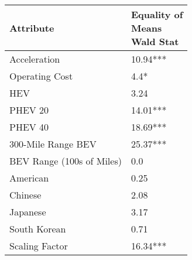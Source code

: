 \begin{tabular}{ll}
\toprule
                Attribute & \makecell{Equality of \\ Means \\ Wald Stat} \\
\midrule
             Acceleration &                    \multirow{1}{*}{10.94***} \\
           Operating Cost &                        \multirow{1}{*}{4.4*} \\
                      HEV &                        \multirow{1}{*}{3.24} \\
                  PHEV 20 &                    \multirow{1}{*}{14.01***} \\
                  PHEV 40 &                    \multirow{1}{*}{18.69***} \\
       300-Mile Range BEV &                    \multirow{1}{*}{25.37***} \\
BEV Range (100s of Miles) &                         \multirow{1}{*}{0.0} \\
                 American &                        \multirow{1}{*}{0.25} \\
                  Chinese &                        \multirow{1}{*}{2.08} \\
                 Japanese &                        \multirow{1}{*}{3.17} \\
             South Korean &                        \multirow{1}{*}{0.71} \\
           Scaling Factor &                    \multirow{1}{*}{16.34***} \\
\bottomrule
\end{tabular}
